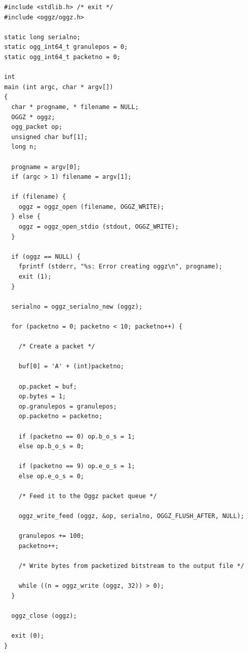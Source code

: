 \footnotesize\begin{verbatim}
#include <stdlib.h> /* exit */
#include <oggz/oggz.h>

static long serialno;
static ogg_int64_t granulepos = 0;
static ogg_int64_t packetno = 0;

int
main (int argc, char * argv[])
{
  char * progname, * filename = NULL;
  OGGZ * oggz;
  ogg_packet op;
  unsigned char buf[1];
  long n;

  progname = argv[0];
  if (argc > 1) filename = argv[1];

  if (filename) {
    oggz = oggz_open (filename, OGGZ_WRITE);
  } else {
    oggz = oggz_open_stdio (stdout, OGGZ_WRITE);
  }

  if (oggz == NULL) {
    fprintf (stderr, "%s: Error creating oggz\n", progname);
    exit (1);
  }

  serialno = oggz_serialno_new (oggz);

  for (packetno = 0; packetno < 10; packetno++) {

    /* Create a packet */

    buf[0] = 'A' + (int)packetno;

    op.packet = buf;
    op.bytes = 1;
    op.granulepos = granulepos;
    op.packetno = packetno;
    
    if (packetno == 0) op.b_o_s = 1;
    else op.b_o_s = 0;
    
    if (packetno == 9) op.e_o_s = 1;
    else op.e_o_s = 0;
    
    /* Feed it to the Oggz packet queue */

    oggz_write_feed (oggz, &op, serialno, OGGZ_FLUSH_AFTER, NULL);
    
    granulepos += 100;
    packetno++;

    /* Write bytes from packetized bitstream to the output file */

    while ((n = oggz_write (oggz, 32)) > 0);
  }

  oggz_close (oggz);

  exit (0);
}
\end{verbatim}
\normalsize
 

